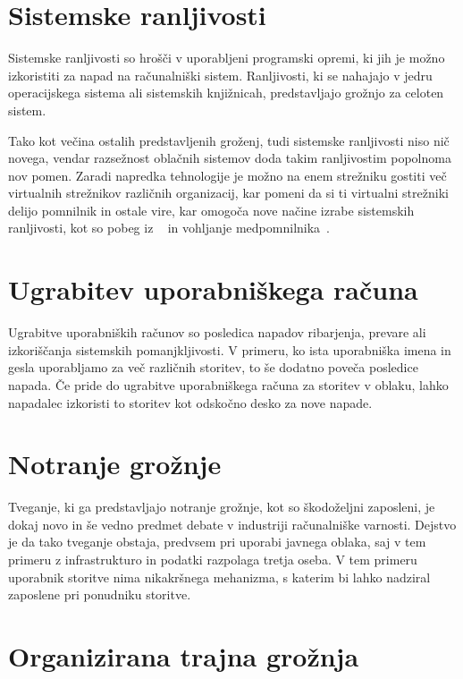 \documentclass[12pt,a4paper,openany,tikz]{book}
\theoremstyle{plain}
\theoremstyle{definition}
\begin{document}
\section{Sistemske ranljivosti}
\label{sub:Sistemske ranljivosti}

Sistemske ranljivosti so hrošči v uporabljeni programski opremi, ki jih je možno izkoristiti za napad na računalniški sistem. Ranljivosti, ki se nahajajo v jedru operacijskega sistema ali sistemskih knjižnicah, predstavljajo grožnjo za celoten sistem.

Tako kot večina ostalih predstavljenih groženj, tudi sistemske ranljivosti niso nič novega, vendar razsežnost oblačnih sistemov doda takim ranljivostim popolnoma nov pomen. Zaradi napredka tehnologije je možno na enem strežniku gostiti več virtualnih strežnikov različnih organizacij, kar pomeni da si ti virtualni strežniki delijo pomnilnik in ostale vire, kar omogoča nove načine izrabe sistemskih ranljivosti, kot so pobeg iz ~\cite{schwartz2012new} in vohljanje medpomnilnika~\cite{zhang2012cross}.

\section{Ugrabitev uporabniškega računa}
\label{sub:Ugrabitev uporabniškega računa}

Ugrabitve uporabniških računov so posledica napadov ribarjenja, prevare ali izkoriščanja sistemskih pomanjkljivosti. V primeru, ko ista uporabniška imena in gesla uporabljamo za več različnih storitev, to še dodatno poveča posledice napada. Če pride do ugrabitve uporabniškega računa za storitev v oblaku, lahko napadalec izkoristi to storitev kot odskočno desko za nove napade.

\section{Notranje grožnje}
\label{sub:Notranje grožnje}

Tveganje, ki ga predstavljajo notranje grožnje, kot so škodoželjni zaposleni, je dokaj novo in še vedno predmet debate v industriji računalniške varnosti. Dejstvo je da tako tveganje obstaja, predvsem pri uporabi javnega oblaka, saj v tem primeru z infrastrukturo in podatki razpolaga tretja oseba. V tem primeru uporabnik storitve nima nikakršnega mehanizma, s katerim bi lahko nadziral zaposlene pri ponudniku storitve.

\section{Organizirana trajna grožnja}
\label{sub:Organizirana trajna grožnja}
\end{document}

